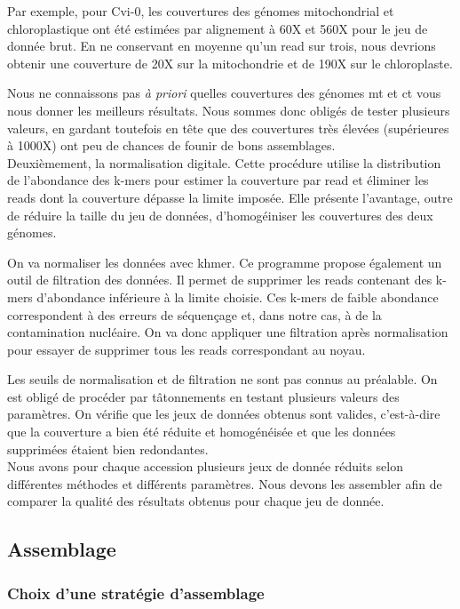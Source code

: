 \documentclass[a4paper]{article}
\begin{document}
Par exemple, pour Cvi-0, les couvertures des génomes mitochondrial et chloroplastique ont été estimées par alignement à 60X et 560X pour le jeu de donnée brut. En ne conservant en moyenne qu'un read sur trois, nous devrions obtenir une couverture de 20X sur la mitochondrie et de 190X sur le chloroplaste. 

Nous ne connaissons pas \textit{à priori} quelles couvertures des génomes mt et ct vous nous donner les meilleurs résultats. Nous sommes donc obligés de tester plusieurs valeurs, en gardant toutefois en tête que des couvertures très élevées (supérieures à 1000X) ont peu de chances de founir de bons assemblages.\\

Deuxièmement, la normalisation digitale. Cette procédure utilise la distribution de l'abondance des k-mers pour estimer la couverture par read et éliminer les reads dont la couverture dépasse la limite imposée.\cite{brown2012reference} Elle présente l'avantage, outre de réduire la taille du jeu de données, d'homogéiniser les couvertures des deux génomes.

On va normaliser les données avec khmer. Ce programme propose également un outil de filtration des données. Il permet de supprimer les reads contenant des k-mers d'abondance inférieure à la limite choisie. Ces k-mers de faible abondance correspondent à des erreurs de séquençage et, dans notre cas, à de la contamination nucléaire. On va donc appliquer une filtration après normalisation pour essayer de supprimer tous les reads correspondant au noyau. 

Les seuils de normalisation et de filtration ne sont pas connus au préalable. On est obligé de procéder par tâtonnements en testant plusieurs valeurs des paramètres. On vérifie que les jeux de données obtenus sont valides, c'est-à-dire que la couverture a bien été réduite et homogénéisée et que les données supprimées étaient bien redondantes.\\ 

Nous avons pour chaque accession plusieurs jeux de donnée réduits selon  différentes méthodes et différents paramètres. Nous devons les assembler afin de comparer la qualité des résultats obtenus pour chaque jeu de donnée. 

\subsection{Assemblage}

\subsubsection{Choix d'une stratégie d'assemblage}
\end{document}
